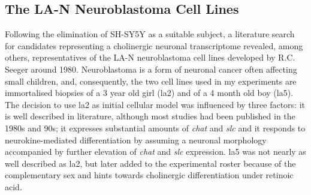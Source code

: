 \subsection{The LA-N Neuroblastoma Cell Lines}
Following the elimination of SH-SY5Y as a suitable subject, a literature search for candidates representing a cholinergic neuronal transcriptome revealed, among others, representatives of the LA-N neuroblastoma cell lines developed by R.C. Seeger around 1980.\cite{Seeger1977, Seeger1982} Neuroblastoma is a form of neuronal cancer often affecting small children, and, consequently, the two cell lines used in my experiments are immortalised biopsies of a 3 year old girl (\acs{la2}\cite{Seeger1977}) and of a 4 month old boy (\mbox{\acs{la5}}\cite{Seeger1982}). The decision to use \ac{la2} as initial cellular model was influenced by three factors: it is well described in literature, although most studies had been published in the 1980s and 90s; it expresses substantial amounts of \textit{\ac{chat}} and \textit{\ac{slc}} and it responds to neurokine-mediated differentiation by assuming a neuronal morphology accompanied by further elevation of \textit{\ac{chat}} and \textit{\ac{slc}} expression.\cite{Crosland1996} \ac{la5} was not nearly as well described as \ac{la2}, but later added to the experimental roster because of the complementary sex and hints towards cholinergic differentiation under retinoic acid.\cite{Hill1997}

